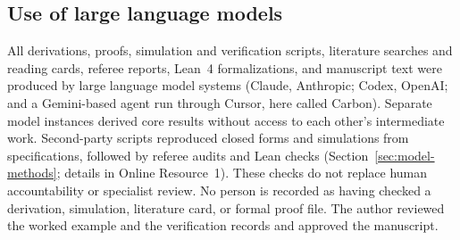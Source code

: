 \subsection{Use of large language models}\label{sec:model-llm}

{\sloppy
All derivations, proofs, simulation and verification scripts, literature searches and reading cards, referee reports, Lean~4 formalizations, and manuscript text were produced by large language model systems (Claude, Anthropic; Codex, OpenAI; and a Gemini-based agent run through Cursor, here called Carbon). Separate model instances derived core results without access to each other's intermediate work. Second-party scripts reproduced closed forms and simulations from specifications, followed by referee audits and Lean checks (Section~\ref{sec:model-methods}; details in Online Resource~1). These checks do not replace human accountability or specialist review. No person is recorded as having checked a derivation, simulation, literature card, or formal proof file. The author reviewed the worked example and the verification records and approved the manuscript.\par}
